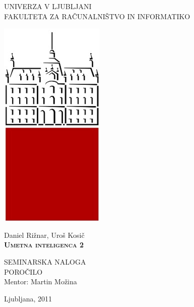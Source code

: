 \documentclass[12pt,a4paper,openany]{book}
\begin{document}
\thispagestyle{empty} 

\begin{center}
{\large 
UNIVERZA V LJUBLJANI\\
FAKULTETA ZA RAČUNALNIŠTVO IN INFORMATIKO\\
}

 \includegraphics[scale=0.2,keepaspectratio=true]{./pictures/uni_logo.png}


\vspace{1.5cm}
{\LARGE Daniel Rižnar, Uroš Kosič}\\

\vspace{2cm}
\textsc{\textbf{\LARGE 
Umetna inteligenca 2
}}

\vspace{2cm}
{ SEMINARSKA NALOGA}\\
{ POROČILO }\\

\vspace{2cm} 
{\Large Mentor: Martin Možina}

\vfill
{\Large Ljubljana, 2011}
\end{center}

\newpage


\renewcommand\thepage{} 
\tableofcontents 
\renewcommand\thepage{\arabic{page}}

\thispagestyle{empty}




\setcounter{page}{1}
\end{document}
